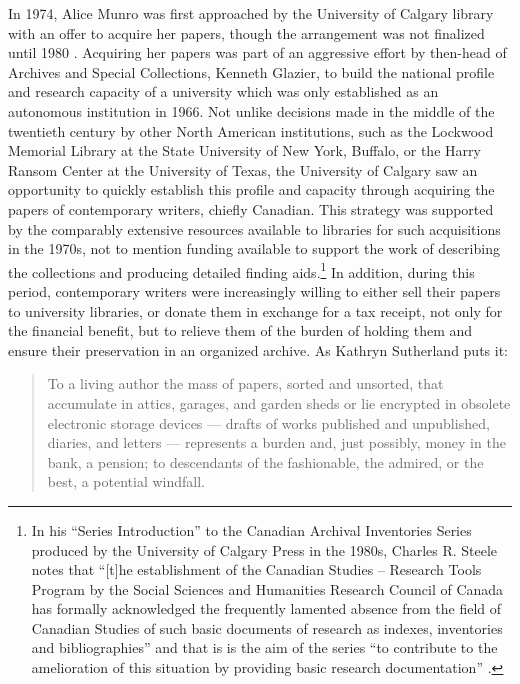 \begin{paper}
In 1974, Alice Munro was first approached by the University of Calgary library with an offer to acquire her papers, though the arrangement was not
finalized until 1980 \citep[xxix]{tener_archival_1986}. Acquiring her papers was
part of an aggressive effort by then-head of Archives and Special
Collections, Kenneth Glazier, to build the national profile and research
capacity of a university which was only established as an autonomous
institution in 1966. Not unlike decisions made in the middle of the
twentieth century by other North American institutions, such as the
Lockwood Memorial Library at the State University of New York, Buffalo,
or the Harry Ransom Center at the University of Texas, the University of
Calgary saw an opportunity to quickly establish this profile and
capacity through acquiring the papers of contemporary writers, chiefly
Canadian. This strategy was supported by the comparably extensive
resources available to libraries for such acquisitions in the 1970s, not
to mention funding available to support the work of describing the
collections and producing detailed finding aids.\footnote{In his
  ``Series Introduction'' to the Canadian Archival Inventories Series
  produced by the University of Calgary Press in the 1980s, Charles R.
  Steele notes that ``{[}t{]}he establishment of the Canadian Studies --
  Research Tools Program by the Social Sciences and Humanities Research
  Council of Canada has formally acknowledged the frequently lamented
  absence from the field of Canadian Studies of such basic documents of
  research as indexes, inventories and bibliographies'' and that is is
  the aim of the series ``to contribute to the amelioration of this
  situation by providing basic research documentation'' \citep[v]{steele_series_1986}.} In
addition, during this period, contemporary writers were increasingly
willing to either sell their papers to university libraries, or donate
them in exchange for a tax receipt, not only for the financial benefit,
but to relieve them of the burden of holding them and ensure their
preservation in an organized archive. As Kathryn Sutherland puts it:

\begin{quote}
To a living author the mass of papers, sorted and unsorted, that accumulate in attics, garages, and garden sheds or lie encrypted in obsolete electronic
storage devices –– drafts of works published and unpublished, diaries,
and letters –– represents a burden
and, just possibly, money in the bank, a pension; to descendants of the
fashionable, the admired, or the best, a potential windfall. 


\end{quote}
\end{paper}
